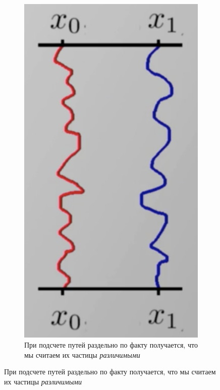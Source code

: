 \begin{lecture}
    \begin{figure}[ht]
        \begin{subfigure}{0.33\columnwidth}
            \centering\includegraphics[width=\linewidth]{fig/two-paths-colored}
            \caption{При подсчете путей раздельно по факту получается, что мы считаем их частицы \textit{различимыми}}

\end{subfigure}
\end{figure}
\end{lecture}
